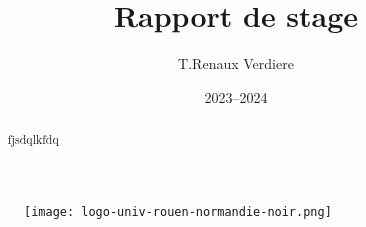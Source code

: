 \documentclass[12pt]{article}
\title{Rapport de stage}
\author{T.Renaux Verdiere}
\date{2023--2024}
\begin{document}
\begin{figure}
    \texttt{[image: logo-univ-rouen-normandie-noir.png]}
\end{figure}

\maketitle

\begin{abstract}
    fjsdqlkfdq
\end{abstract}

\newpage   

\tableofcontents

\newpage







\newpage

\printbibliography
\end{document}

